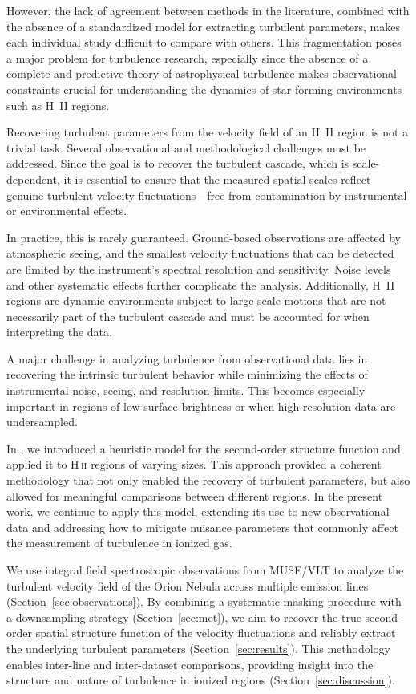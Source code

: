 \documentclass[fleqn,usenatbib, useAMS, a4paper]{mnras}
\begin{document}
However, the lack of agreement between methods in the literature, combined with the absence of a standardized model for extracting turbulent parameters, makes each individual study difficult to compare with others. 
This fragmentation poses a major problem for turbulence research, especially since the absence of a complete and predictive theory of astrophysical turbulence makes observational constraints crucial for understanding the dynamics of star-forming environments such as H~II regions.

Recovering turbulent parameters from the velocity field of an H~II region is not a trivial task. 
Several observational and methodological challenges must be addressed. Since the goal is to recover the turbulent cascade, which is scale-dependent, it is essential to ensure that the measured spatial scales reflect genuine turbulent velocity fluctuations—free from contamination by instrumental or environmental effects.

In practice, this is rarely guaranteed. 
Ground-based observations are affected by atmospheric seeing, and the smallest velocity fluctuations that can be detected are limited by the instrument’s spectral resolution and sensitivity. 
Noise levels and other systematic effects further complicate the analysis. Additionally, H~II regions are dynamic environments subject to large-scale motions that are not necessarily part of the turbulent cascade and must be accounted for when interpreting the data.

A major challenge in analyzing turbulence from observational data lies in recovering the intrinsic turbulent behavior while minimizing the effects of instrumental noise, seeing, and resolution limits.
This becomes especially important in regions of low surface brightness or when high-resolution data are undersampled.

In \citet{garciav23}, we introduced a heuristic model for the second-order structure function and applied it to H\,\textsc{ii} regions of varying sizes. 
This approach provided a coherent methodology that not only enabled the recovery of turbulent parameters, but also allowed for meaningful comparisons between different regions. 
In the present work, we continue to apply this model, extending its use to new observational data and addressing how to mitigate nuisance parameters that commonly affect the measurement of turbulence in ionized gas.

We use integral field spectroscopic observations from MUSE/VLT to analyze the turbulent velocity field of the Orion Nebula across multiple emission lines (Section~\ref{sec:observations}). 
By combining a systematic masking procedure with a downsampling strategy (Section~\ref{sec:met}), we aim to recover the true second-order spatial structure function of the velocity fluctuations and reliably extract the underlying turbulent parameters (Section~\ref{sec:results}). 
This methodology enables inter-line and inter-dataset comparisons, providing insight into the structure and nature of turbulence in ionized regions (Section~\ref{sec:discussion}).
\end{document}
